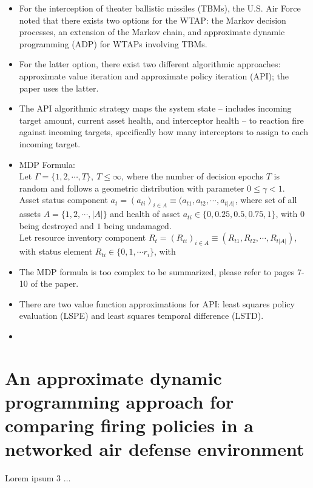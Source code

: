 \documentclass[12pt]{article} %
\renewcommand\le{\leqslant}
\begin{document}
\begin{itemize}
    \item For the interception of theater ballistic missiles (TBMs), the U.S. Air Force noted that there exists two options for the WTAP: the Markov decision processes, an extension of the Markov chain, and approximate dynamic programming (ADP) for WTAPs involving TBMs.
    \item For the latter option, there exist two different algorithmic approaches: approximate value iteration and approximate policy iteration (API); the paper uses the latter.
    \item The API algorithmic strategy maps the system state -- includes incoming target amount, current asset health, and interceptor health -- to reaction fire against incoming targets, specifically how many interceptors to assign to each incoming target.
    \item MDP Formula:\\
    Let $\Gamma = \{1, 2, \cdots, T\},\ T \le \infty$, where the number of decision epochs $T$ is random and follows a geometric distribution with parameter $0 \le \gamma < 1$. \\Asset status component $a_t = (a_{ti})_{i\in A}\equiv (a_{t1}, a_{t2}, \cdots, a_{t|A|}$, where set of all assets $A = \{1, 2, \cdots, |A|\}$ and health of asset $a_{ti} \in \{0, 0.25, 0.5, 0.75, 1\}$, with $0$ being destroyed and $1$ being undamaged. \\
    Let resource inventory component $R_t = (R_{ti})_{i\in A} \equiv (R_{t1}, R_{t2}, \cdots, R_{t|A|})$, with status element $R_{ti} \in \{0,1,\cdots r_i\}$, with
    \item The MDP formula is too complex to be summarized, please refer to pages 7-10 of the paper.
    \item There are two value function approximations for API: least squares policy evaluation (LSPE) and least squares temporal difference (LSTD).
    \item \begin{center}
        \begin{enumerate}
        \end{enumerate}
    \end{center}
\end{itemize}



\section*{An approximate dynamic programming approach for comparing firing policies in a networked air defense environment \cite{Summers2020AnAD}}
Lorem ipsum 3 $\ldots$
\end{document}
